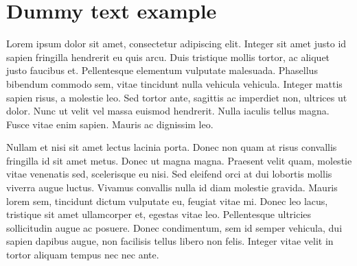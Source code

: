 \documentclass[reqno,final,11pt]{amsart}
\theoremstyle{plain}
\theoremstyle{definition}
\theoremstyle{remark}
\begin{document}
\section{Dummy text example}\label{sec2}

Lorem ipsum dolor sit amet, consectetur adipiscing elit. Integer sit amet justo id sapien fringilla hendrerit eu quis arcu. Duis tristique mollis tortor, ac aliquet justo faucibus et. Pellentesque elementum vulputate malesuada. Phasellus bibendum commodo sem, vitae tincidunt nulla vehicula vehicula. Integer mattis sapien risus, a molestie leo. Sed tortor ante, sagittis ac imperdiet non, ultrices ut dolor. Nunc ut velit vel massa euismod hendrerit. Nulla iaculis tellus magna. Fusce vitae enim sapien. Mauris ac dignissim leo.


 Nullam et nisi sit amet lectus lacinia porta. Donec non quam at risus convallis fringilla id sit amet metus. Donec ut magna magna. Praesent velit quam, molestie vitae venenatis sed, scelerisque eu nisi. Sed eleifend orci at dui lobortis mollis viverra augue luctus. Vivamus convallis nulla id diam molestie gravida. Mauris lorem sem, tincidunt dictum vulputate eu, feugiat vitae mi. Donec leo lacus, tristique sit amet ullamcorper et, egestas vitae leo. Pellentesque ultricies sollicitudin augue ac posuere. Donec condimentum, sem id semper vehicula, dui sapien dapibus augue, non facilisis tellus libero non felis. Integer vitae velit in tortor aliquam tempus nec nec ante.
\end{document}
